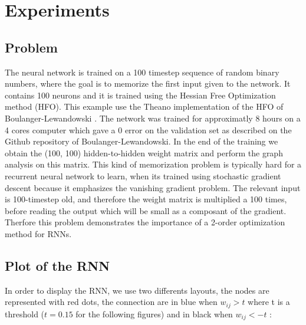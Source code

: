 \section{Experiments}

\subsection{Problem}

The neural network is trained on a 100 timestep sequence of random binary numbers, where the goal is to memorize the first input given to the network. It contains 100 neurons and it is trained using the Hessian Free Optimization method (HFO). This example use the Theano implementation of the HFO of Boulanger-Lewandowski \cite{boulanger2012modeling}. The network was trained for approximatly 8 hours on a 4 cores computer which gave a 0 error on the validation set as described on the Github repository of Boulanger-Lewandowski. In the end of the training we obtain the (100, 100) hidden-to-hidden weight matrix and perform the graph analysis on this matrix. This kind of memorization problem is typically hard for a recurrent neural network to learn, when its trained using stochastic gradient descent because it emphasizes the vanishing gradient problem. The relevant input is 100-timestep old, and therefore the weight matrix is multiplied a 100 times, before reading the output which will be small as a composant of the gradient. Therfore this problem demonstrates the importance of a 2-order optimization method for RNNs. 

\subsection{Plot of the RNN}

In order to display the RNN, we use two differents layouts, the nodes are represented with red dots, the connection are in blue when $w_{ij}  > t $ where t is a threshold ($ t=0.15$ for the following figures) and in black when $w_{ij} < - t$  :

